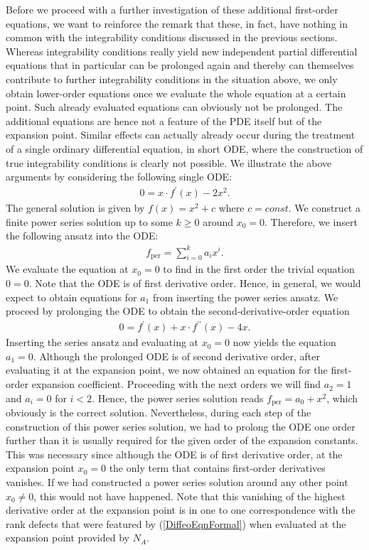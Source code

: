 Before we proceed with a further investigation of these additional first-order equations, we want to reinforce the remark that these, in fact, have nothing in common with the integrability conditions discussed in the previous sections. Whereas integrability conditions really yield new independent partial differential equations that in particular can be prolonged again and thereby can themselves contribute to further integrability conditions in the situation above, we only obtain lower-order equations once we evaluate the whole equation at a certain point. Such already evaluated equations can obviously not be prolonged. The additional equations are hence not a feature of the PDE itself but of the expansion point. Similar effects can actually already occur during the treatment of a single ordinary differential equation, in short ODE, where the construction of true integrability conditions is clearly not possible. We illustrate the above arguments by considering the following single ODE:
\begin{align}
    0 = x \cdot f^{\prime}(x) - 2x^2.
\end{align}
The general solution is given by $f(x) = x^2 +c$ where $c=const$. We construct a finite power series solution up to some $k \geq 0$ around $x_0 = 0$. Therefore, we insert the following ansatz into the ODE:
\begin{align}
    f_{\text{per}} = \sum_{i=0}^k a_i x^i.
\end{align}
We evaluate the equation at $x_0=0$ to find in the first order the trivial equation $0=0$. Note that the ODE is of first derivative order. Hence, in general, we would expect to obtain equations for $a_1$ from inserting the power series ansatz. We proceed by prolonging the ODE to obtain the second-derivative-order equation
\begin{align}
    0 = f^{\prime}(x) + x \cdot f^{\prime \prime}(x) - 4 x.
\end{align}
Inserting the series ansatz and evaluating at $x_0=0$ now yields the equation $a_1=0$. Although the prolonged ODE is of second derivative order, after evaluating it at the expansion point, we now obtained an equation for the first-order expansion coefficient. Proceeding with the next orders we will find $a_2 = 1$ and $a_i = 0$ for $i < 2$. Hence, the power series solution reads $f_{\text{per}} = a_0 + x^2$, which obviously is the correct solution. Nevertheless, during each step of the construction of this power series solution, we had to prolong the ODE one order further than it is usually required for the given order of the expansion constants. This was necessary since although the ODE is of first derivative order, at the expansion point $x_0=0$ the only term that contains first-order derivatives vanishes. If we had constructed a power series solution around any other point $x_0 \neq 0$, this would not have happened. Note that this vanishing of the highest derivative order at the expansion point is in one to one correspondence with the rank defects that were featured by (\ref{DiffeoEqnFormal}) when evaluated at the expansion point provided by $N_A$. 


